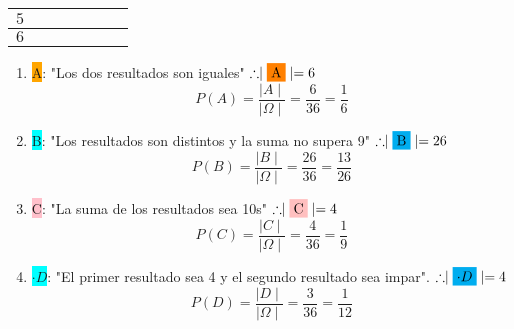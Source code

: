 \documentclass[../main.tex]{subfiles}
\begin{document}
\begin{defexamples}
\begin{enumerate}
\begin{itemize}
\begin{table}[H]
\begin{center}
\begin{tabular}{c|c|c|c|c|c|c}
                                \hline
                                $5$ & \cellcolor{cyan} & \cellcolor{cyan} & \cellcolor{cyan} & \cellcolor{cyan}{$\cdot$} & \cellcolor{orange} & \cellcolor{pink}\\
                                \hline
                                $6$ & \cellcolor{cyan} & \cellcolor{cyan} & \cellcolor{cyan} & \cellcolor{pink} & \cellcolor{pink} & \cellcolor{orange}\\
                            \end{tabular}
                        \end{center}
                    \end{table}
                \end{itemize}
            \begin{enumerate}
                \item \colorbox{orange}{A}: "Los dos resultados son iguales" $\therefore \mid\colorbox{orange}{A}\mid = 6$ 
                \begin{equation*}
                    P(A) = \frac{\mid A\mid}{\mid\Omega\mid} = \frac{6}{36} = \frac{1}{6}
                \end{equation*}
                \item \colorbox{cyan}{B}: "Los resultados son distintos y la suma no supera 9" $\therefore \mid\colorbox{cyan}{B}\mid = 26$
                    \begin{equation*}
                        P(B) = \frac{\mid B\mid}{\mid\Omega\mid} = \frac{26}{36} = \frac{13}{26}
                    \end{equation*}
                \item  \colorbox{pink}{C}: "La suma de los resultados sea 10s" $\therefore \mid\colorbox{pink}{C}\mid = 4$
                    \begin{equation*}
                        P(C) = \frac{\mid C\mid}{\mid\Omega\mid} = \frac{4}{36} = \frac{1}{9}
                    \end{equation*}
                \item  \colorbox{cyan}{$\cdot D$}: "El primer resultado sea 4 y el segundo resultado sea impar". $\therefore \mid\colorbox{cyan}{$\cdot D$}\mid = 4$
                \begin{equation*}
                    P(D) = \frac{\mid D\mid}{\mid\Omega\mid} = \frac{3}{36} = \frac{1}{12}
                \end{equation*}
            \end{enumerate}

    \end{enumerate}
\end{defexamples}
\end{document}

